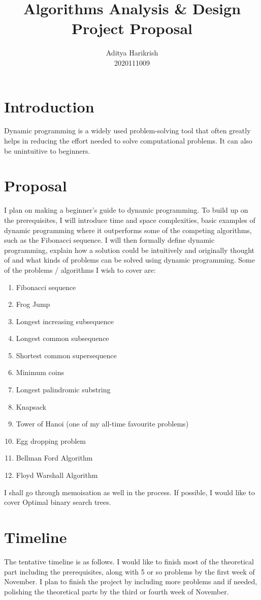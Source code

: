 \documentclass[12pt, a4paper]{article}
\title{Algorithms Analysis \& Design\\Project Proposal}
\author{Aditya Harikrish\\2020111009}
\date{}
\theoremstyle{definition}
\theoremstyle{remark}
\begin{document}
\maketitle

\section{Introduction}
Dynamic programming is a widely used problem-solving tool that often greatly helps in reducing the effort needed to solve computational problems. It can also be unintuitive to beginners.

\section{Proposal}
I plan on making a beginner's guide to dynamic programming. To build up on the prerequisites, I will introduce time and space complexities, basic examples of dynamic programming where it outperforms some of the competing algorithms, such as the Fibonacci sequence. I will then formally define dynamic programming, explain how a solution could be intuitively and originally thought of and what kinds of problems can be solved using dynamic programming. Some of the problems / algorithms I wish to cover are:
\begin{enumerate}
    \item Fibonacci sequence
    \item Frog Jump
    \item Longest increasing subsequence
    \item Longest common subsequence
    \item Shortest common supersequence
    \item Minimum coins
    \item Longest palindromic substring
    \item Knapsack
    \item Tower of Hanoi (one of my all-time favourite problems)
    \item Egg dropping problem
    \item Bellman Ford Algorithm
    \item Floyd Warshall Algorithm
\end{enumerate}
I shall go through memoisation as well in the process. If possible, I would like to cover Optimal binary search trees.

\section{Timeline}
The tentative timeline is as follows. I would like to finish most of the theoretical part including the prerequisites, along with 5 or so problems by the first week of November.
I plan to finish the project by including more problems and if needed, polishing the theoretical parts by the third or fourth week of November.
\end{document}
